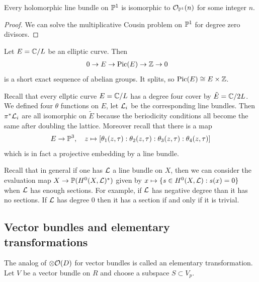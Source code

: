 \documentclass[12pt]{article}
\begin{document}
\begin{proposition}
    Every holomorphic line bundle on $\P^1$ is isomorphic to $\mathcal{O}_{\P^1}(n)$ for some integer $n$.
\end{proposition}

\begin{proof}
    We can solve the multiplicative Cousin problem on $\P^1$ for degree zero divisors.
\end{proof}

\begin{proposition}
    Let $E = \C/L$ be an elliptic curve. Then \begin{align*}
        0 \to E & \to \Pic(E) \to \Z \to 0 
    \end{align*}
    is a short exact sequence of abelian groups. It splits, so $\Pic(E) \cong E \times \Z$.
\end{proposition}

\begin{example}
     Recall that every ellptic curve $E = \C/L$ has a degree four cover by $\tilde E = \C/2L$. We defined four $\theta$ functions on $E$, let $\cL_i$ be the corresponding line bundles. Then $\pi^*\cL_i$ are all isomorphic on $\tilde E$ because the beriodicity conditions all become the same after doubling the lattice. Moreover recall that there is a map \begin{align*}
        E \to \P^3, \quad z \mapsto [\theta_1(z,\tau):\theta_2(z,\tau):\theta_3(z,\tau):\theta_4(z,\tau)]
    \end{align*} which is in fact a projective embedding by a line bundle.
\end{example}
Recall that in general if one has $\cL$ a line bundle on $X$, then we can consider the evaluation map $X \to \P(H^0(X,\cL)^*)$ given by $x \mapsto \{s \in H^0(X,\cL) : s(x)=0\}$ when $\cL$ has enough sections. For example, if $\cL$ has negative degree than it has no sections. If $\cL$ has degree $0$ then it has a section if and only if it is trivial. 

\subsection{Vector bundles and elementary transformations}
The analog of $\otimes \cO(D)$ for vector bundles is called an elementary transformation. Let $V$ be a vector bundle on $R$ and choose a subspace $S\subset V_p$. 
\end{document}
